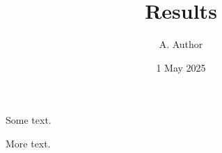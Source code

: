 \documentclass{beamer}
\title{Results}
\author{A. Author}
\institute{Some University}
\date{1 May 2025}
\begin{document}
\begin{frame}
Some text.
\end{frame}
\begin{frame}
More text.
\end{frame}
\end{document}
